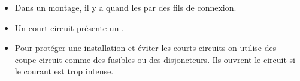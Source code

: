 \documentclass[xcolor={dvipsnames}]{beamer}
\begin{document}
\begin{frame}
	
	\begin{mybilan}
		\begin{itemize}
			\item Dans un montage, il y a  quand les  par des fils de connexion.\pause
			
			\item Un court-circuit présente un .\pause
			
			\item Pour protéger une installation et éviter les courts-circuits on utilise des coupe-circuit comme des fusibles ou des disjoncteurs. Ils ouvrent le circuit si le courant est trop intense.
		\end{itemize}
	\end{mybilan}
\end{frame}


%
%	
%
%
%	
\end{document}
